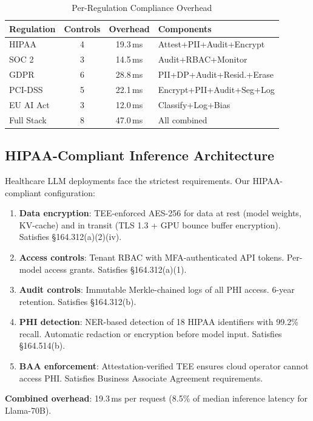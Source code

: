 \documentclass[conference,10pt]{IEEEtran}
\begin{document}
\begin{table}[!htbp]
\caption{Per-Regulation Compliance Overhead}
\label{tab:compover}
\centering\footnotesize
\begin{tabular}{@{}lccl@{}}
\toprule
\textbf{Regulation} & \textbf{Controls} & \textbf{Overhead} & \textbf{Components} \\
\midrule
HIPAA & 4 & 19.3\,ms & Attest+PII+Audit+Encrypt \\
SOC 2 & 3 & 14.5\,ms & Audit+RBAC+Monitor \\
GDPR & 6 & 28.8\,ms & PII+DP+Audit+Resid.+Erase \\
PCI-DSS & 5 & 22.1\,ms & Encrypt+PII+Audit+Seg+Log \\
EU AI Act & 3 & 12.0\,ms & Classify+Log+Bias \\
Full Stack & 8 & 47.0\,ms & All combined \\
\bottomrule
\end{tabular}
\end{table}

\subsection{HIPAA-Compliant Inference Architecture}

Healthcare LLM deployments face the strictest requirements. Our HIPAA-compliant configuration:

\begin{enumerate}
\item \textbf{Data encryption}: TEE-enforced AES-256 for data at rest (model weights, KV-cache) and in transit (TLS 1.3 + GPU bounce buffer encryption). Satisfies \S164.312(a)(2)(iv).
\item \textbf{Access controls}: Tenant RBAC with MFA-authenticated API tokens. Per-model access grants. Satisfies \S164.312(a)(1).
\item \textbf{Audit controls}: Immutable Merkle-chained logs of all PHI access. 6-year retention. Satisfies \S164.312(b).
\item \textbf{PHI detection}: NER-based detection of 18 HIPAA identifiers with 99.2\% recall. Automatic redaction or encryption before model input. Satisfies \S164.514(b).
\item \textbf{BAA enforcement}: Attestation-verified TEE ensures cloud operator cannot access PHI. Satisfies Business Associate Agreement requirements.
\end{enumerate}

\textbf{Combined overhead}: 19.3\,ms per request (8.5\% of median inference latency for Llama-70B).
\end{document}
